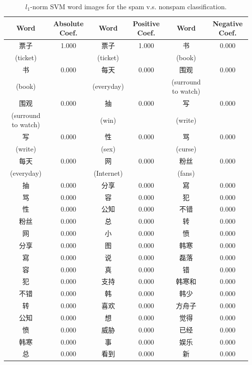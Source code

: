 \documentclass[11pt]{article}
\newcommand{\1}[1]{{\mathbf 1}\left\{#1\right\}}        %
\begin{document}
\begin{table}[!h]
\caption{$l_1$-norm SVM word images for the spam v.s. nonspam classification.}
\begin{center}
\begin{tabular}{|c|c||c|c||c|c|}
\hline
Word & Absolute Coef. & Word & Positive Coef. & Word & Negative Coef.\\ \hline\hline
票子 & 1.000 & 票子 & 1.000 & 书 & 0.000\\
(ticket) & & (ticket) & & (book) & \\\hline
书 & 0.000 & 每天 & 0.000 & 围观 & 0.000\\
(book) & & (everyday) & & (surround to watch) & \\\hline
围观 & 0.000 & 抽 & 0.000 & 写 & 0.000\\
(surround to watch) & & (win) & & (write) & \\\hline
写 & 0.000 & 性 & 0.000 & 骂 & 0.000\\
(write) & & (sex) & & (curse) & \\\hline
每天 & 0.000 & 网 & 0.000 & 粉丝 & 0.000\\
(everyday) & & (Internet) & & (fans) & \\\hline
抽 & 0.000 & 分享 & 0.000 & 寫 & 0.000\\ \hline
骂 & 0.000 & 容 & 0.000 & 犯 & 0.000\\ \hline
性 & 0.000 & 公知 & 0.000 & 不错 & 0.000\\ \hline
粉丝 & 0.000 & 总 & 0.000 & 转 & 0.000\\ \hline
网 & 0.000 & 小 & 0.000 & 愤 & 0.000\\ \hline
分享 & 0.000 & 图 & 0.000 & 韩寒 & 0.000\\ \hline
寫 & 0.000 & 说 & 0.000 & 磊落 & 0.000\\ \hline
容 & 0.000 & 真 & 0.000 & 错 & 0.000\\ \hline
犯 & 0.000 & 支持 & 0.000 & 韩寒和 & 0.000\\ \hline
不错 & 0.000 & 韩 & 0.000 & 韩少 & 0.000\\ \hline
转 & 0.000 & 喜欢 & 0.000 & 方舟子 & 0.000\\ \hline
公知 & 0.000 & 想 & 0.000 & 觉得 & 0.000\\ \hline
愤 & 0.000 & 威胁 & 0.000 & 已经 & 0.000\\ \hline
韩寒 & 0.000 & 事 & 0.000 & 娱乐 & 0.000\\ \hline
总 & 0.000 & 看到 & 0.000 & 新 & 0.000\\ \hline
\end{tabular}
\label{tb:svmfullspam}
\end{center}
\end{table}
\end{document}
